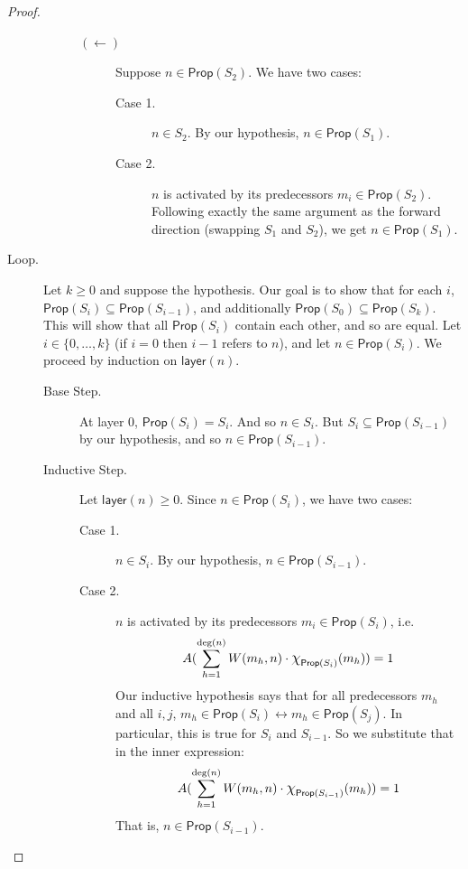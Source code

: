 \documentclass[letterpaper]{article}
\theoremstyle{definition}
\newcommand{\set}[1]{\{ #1 \}}
\newcommand*{\bigchi}{\mbox{\Large$\chi$}}%
\newcommand{\indegree}[1]{\mathrm{deg}(#1)}
\newcommand{\layer}[1]{\mathsf{layer}(#1)}
\newcommand{\Prop}{\textsf{Prop}}
\begin{document}
\begin{proof}
\begin{description}
\begin{description}
\begin{description}
                \item[$(\leftarrow)$] Suppose $n \in \Prop(S_2)$.  We have two cases:
                \begin{description}
                    \item[Case 1.] $n \in S_2$.  By our hypothesis, $n \in \Prop(S_1)$.
                    \item[Case 2.] $n$ is activated by its predecessors $m_i \in \Prop(S_2)$.  Following exactly the same argument as the forward direction (swapping $S_1$ and $S_2$), we get $n \in \Prop(S_1)$.
                \end{description}
            \end{description}
        \end{description}

        \item[Loop.] Let $k \geq 0$ and suppose the hypothesis.  Our goal is to show that for each $i$, $\Prop(S_i) \subseteq \Prop(S_{i-1})$, and additionally $\Prop(S_0) \subseteq \Prop(S_k)$.  This will show that all $\Prop(S_i)$ contain each other, and so are equal.  Let $i \in \set{0, \ldots, k}$ (if $i = 0$ then $i-1$ refers to $n$), and let $n \in \Prop(S_i)$.  We proceed by induction on $\layer{n}$.
        \begin{description}
            \item[Base Step.] At layer $0$, $\Prop(S_i) = S_i$.  And so $n \in S_i$.  But $S_i \subseteq \Prop(S_{i-1})$ by our hypothesis, and so $n \in \Prop(S_{i-1})$.

            \item[Inductive Step.] Let $\layer{n} \geq 0$.  Since $n \in \Prop(S_i)$, we have two cases:
            \begin{description}
                \item[Case 1.] $n \in S_i$.  By our hypothesis, $n \in \Prop(S_{i-1})$.
                \item[Case 2.] $n$ is activated by its predecessors $m_i \in \Prop(S_i)$, i.e.~
                \[
                A(\sum_{h=1}^{\indegree{n}} W(m_h, n) \cdot \bigchi_{\Prop(S_i)}(m_h)) = 1
                \]
                Our inductive hypothesis says that for all predecessors $m_h$ and all $i, j$, $m_h \in \Prop(S_i) \leftrightarrow m_h \in \Prop(S_j)$.  In particular, this is true for $S_i$ and $S_{i-1}$.  So we substitute that in the inner expression:
                \[
                A(\sum_{h=1}^{\indegree{n}} W(m_h, n) \cdot \bigchi_{\Prop(S_{i-1})}(m_h)) = 1
                \]
                That is, $n \in \Prop(S_{i-1})$.
            \end{description}
        \end{description}
        
    \end{description}

\end{proof}
\end{document}
